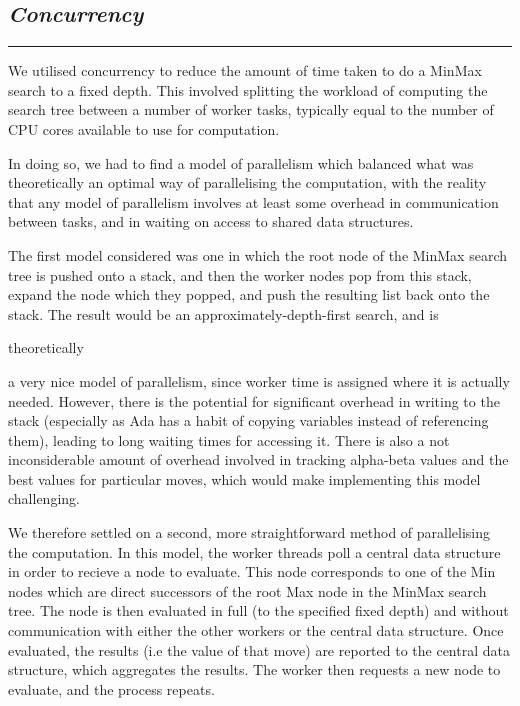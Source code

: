 \documentclass[10pt]{report}
\begin{document}
\begin{multicols}{2}
\section*{\emph{Concurrency}}
\hrule

We utilised concurrency to reduce the amount of time taken to do a MinMax search to a fixed depth. This involved splitting the workload of computing the search tree between a number of worker tasks, typically equal to the number of CPU cores available to use for computation.

In doing so, we had to find a model of parallelism which balanced what was theoretically an optimal way of parallelising the computation, with the reality that any model of parallelism involves at least some overhead in communication between tasks, and in waiting on access to shared data structures.

The first model considered was one in which the root node of the MinMax search tree is pushed onto a stack, and then the worker nodes pop from this stack, expand the node which they popped, and push the resulting list back onto the stack. The result would be an approximately-depth-first search, and is \begin{em} theoretically \end{em} a very nice model of parallelism, since worker time is assigned where it is actually needed. However, there is the potential for significant overhead in writing to the stack (especially as Ada has a habit of copying variables instead of referencing them), leading to long waiting times for accessing it. There is also a not inconsiderable amount of overhead involved in tracking alpha-beta values and the best values for particular moves, which would make implementing this model challenging.

We therefore settled on a second, more straightforward method of parallelising the computation. In this model, the worker threads poll a central data structure in order to recieve a node to evaluate. This node corresponds to one of the Min nodes which are direct successors of the root Max node in the MinMax search tree. The node is then evaluated in full (to the specified fixed depth) and without communication with either the other workers or the central data structure. Once evaluated, the results (i.e the value of that move) are reported to the central data structure, which aggregates the results. The worker then requests a new node to evaluate, and the process repeats.


\end{multicols}
\end{document}
